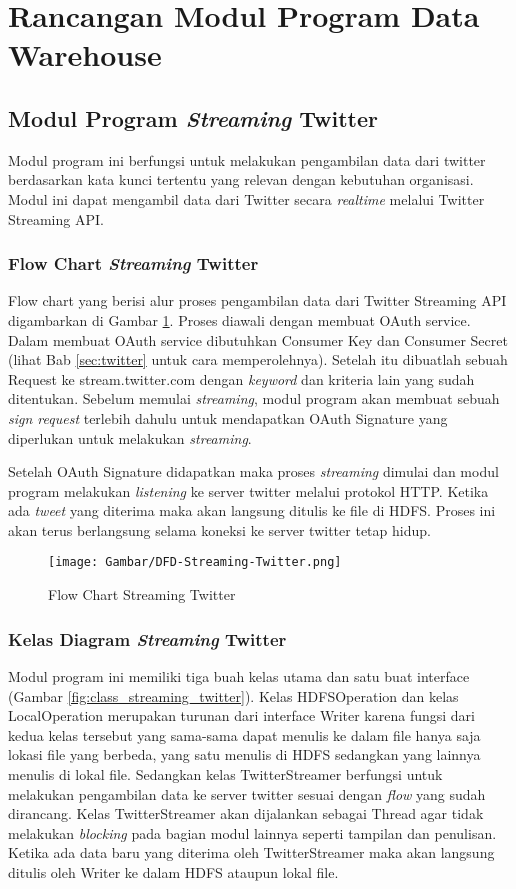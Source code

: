 \section{Rancangan Modul Program Data Warehouse}
\subsection{Modul Program \textit{Streaming} Twitter}
Modul program ini berfungsi untuk melakukan pengambilan data dari twitter berdasarkan kata kunci tertentu yang relevan dengan kebutuhan organisasi. Modul ini dapat mengambil data dari Twitter secara \textit{realtime} melalui Twitter Streaming API. 

\subsubsection{Flow Chart  \textit{Streaming} Twitter}
Flow chart yang berisi alur proses pengambilan data dari Twitter Streaming API digambarkan di Gambar \ref{fig:flow_streaming_twitter}. Proses diawali dengan membuat OAuth service. Dalam membuat OAuth service dibutuhkan Consumer Key dan Consumer Secret (lihat Bab \ref{sec:twitter} untuk cara memperolehnya). Setelah itu dibuatlah sebuah Request ke stream.twitter.com dengan \textit{keyword} dan kriteria lain yang sudah ditentukan. Sebelum memulai \textit{streaming}, modul program akan membuat sebuah \textit{sign request} terlebih dahulu untuk mendapatkan OAuth Signature yang diperlukan untuk melakukan \textit{streaming}. 

Setelah OAuth Signature didapatkan maka proses \textit{streaming} dimulai dan modul program melakukan \textit{listening} ke server twitter melalui protokol HTTP. Ketika ada \textit{tweet} yang diterima maka akan langsung ditulis ke file di HDFS. Proses ini akan terus berlangsung selama koneksi ke server twitter tetap hidup.
 
\begin{figure}[H]
	\centering
	\texttt{[image: Gambar/DFD-Streaming-Twitter.png]}
	\caption[Flow Chart Streaming Twitter]{Flow Chart Streaming Twitter} 
	\label{fig:flow_streaming_twitter}
\end{figure}

\subsubsection{Kelas Diagram \textit{Streaming} Twitter}
Modul program ini memiliki tiga buah kelas utama dan satu buat interface (Gambar \ref{fig:class_streaming_twitter}). Kelas HDFSOperation dan kelas LocalOperation merupakan turunan dari interface Writer karena fungsi dari kedua kelas tersebut yang sama-sama dapat menulis ke dalam file hanya saja lokasi file yang berbeda, yang satu menulis di HDFS sedangkan yang lainnya menulis di lokal file. Sedangkan kelas TwitterStreamer berfungsi untuk melakukan pengambilan data ke server twitter sesuai dengan \textit{flow} yang sudah dirancang. Kelas TwitterStreamer akan dijalankan sebagai Thread agar tidak melakukan \textit{blocking} pada bagian modul lainnya seperti tampilan dan penulisan. Ketika ada data baru yang diterima oleh TwitterStreamer maka akan langsung ditulis oleh Writer ke dalam HDFS ataupun lokal file.

